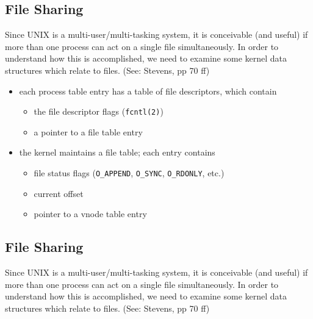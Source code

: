 \documentclass[xga]{xdvislides}
\begin{document}
\subsection{File Sharing}
Since UNIX is a multi-user/multi-tasking system, it is conceivable (and
useful) if more than one process can act on a single file simultaneously. In
order to understand how this is accomplished, we need to examine some kernel
data structures which relate to files.  (See: Stevens, pp 70 ff)

\begin{itemize}
	\item each process table entry has a table of file descriptors, which contain
		\begin{itemize}
			\item the file descriptor flags (\verb+fcntl(2)+)
			\item a pointer to a file table entry
		\end{itemize}
	\item the kernel maintains a file table;  each entry contains
		\begin{itemize}
			\item file status flags (\verb+O_APPEND+, \verb+O_SYNC+, \verb+O_RDONLY+, etc.)
			\item current offset
			\item pointer to a vnode table entry
		\end{itemize}
\end{itemize}

\subsection{File Sharing}
Since UNIX is a multi-user/multi-tasking system, it is conceivable (and useful)
if more than one process can act on a single file simultaneously. In
order to understand how this is accomplished, we need to examine some kernel
data structures which relate to files.  (See: Stevens, pp 70 ff)
\end{document}
